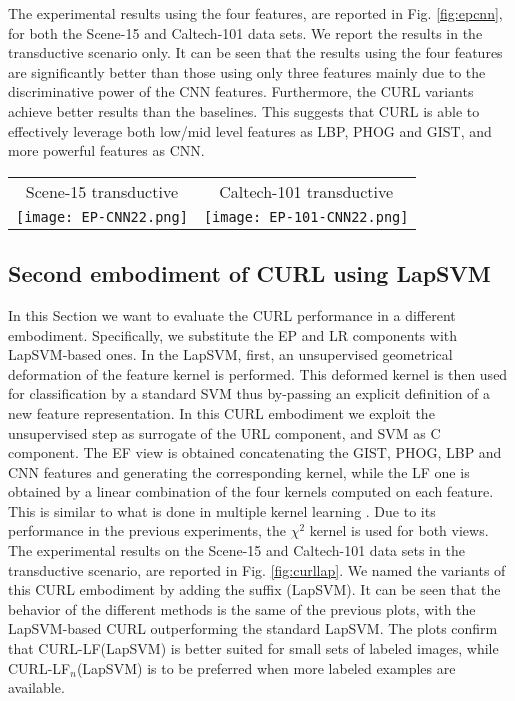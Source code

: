 \documentclass[journal,11pt]{IEEEtran}
\newcommand{\ADD}[1]{#1}
\newcommand{\emb}{embodiment}
\newcommand{\curllaplf}{CURL-LF(LapSVM)}
\newcommand{\curllaplfn}{CURL-LF$_n$(LapSVM)}
\begin{document}
The experimental results using the four features, are reported in Fig. \ref{fig:epcnn}, for both the Scene-15 and Caltech-101 data sets. We report the results in the transductive scenario only. It can be seen that the results using the four features are significantly better than those using only three features mainly due to the discriminative power of the CNN features. Furthermore, the CURL variants achieve better results than the baselines. This suggests that CURL is able to effectively leverage both low/mid level features as LBP, PHOG and GIST, and  more powerful features as CNN.

\begin{figure*}[ht]%
\centering
\begin{tabular}{cc}
\footnotesize{Scene-15 transductive} & \footnotesize{Caltech-101 transductive}\\
\texttt{[image: EP-CNN22.png]} &
\texttt{[image: EP-101-CNN22.png]} \\
\end{tabular}
\caption{Mean Average Precision (MAP) varying the number of labeled images per class, obtained on the Scene-15 data set (left), and on the Caltech-101
data set (right). Results are obtained using GIST, PHOG, LBP and CNN features.}
\label{fig:epcnn}
\end{figure*}

\subsection{Second \emb{ }of CURL using LapSVM}
\label{subsec:curllap}
\ADD{
In this Section we want to evaluate the CURL performance in a different \emb. Specifically, we substitute the EP and LR components with LapSVM-based ones.
In the LapSVM, first, an unsupervised geometrical deformation of the feature kernel is performed. This deformed kernel is then used for classification by a standard SVM thus by-passing an explicit definition of a new feature representation. In this CURL \emb{ }we exploit the unsupervised step as surrogate of the URL component, and SVM as C component.
The EF view is obtained concatenating the GIST, PHOG, LBP and CNN features and generating the corresponding kernel, while the LF one is obtained by a linear combination of the four kernels computed on each feature. This is similar to what is done in multiple kernel learning \cite{gonen2011multiple}. Due to its performance in the previous experiments, the $\chi^2$ kernel is used for both views.
The experimental results on the Scene-15 and Caltech-101 data sets in the transductive scenario, are reported in Fig. \ref{fig:curllap}. We named the variants of this CURL \emb{ }by adding the suffix (LapSVM). It can be seen that the behavior of the different methods is the same of the previous plots, with the LapSVM-based CURL outperforming the standard LapSVM. The plots confirm that \curllaplf{ }is better suited for small sets of labeled images, while \curllaplfn{ }is to be preferred when more labeled examples are available.}
\end{document}
